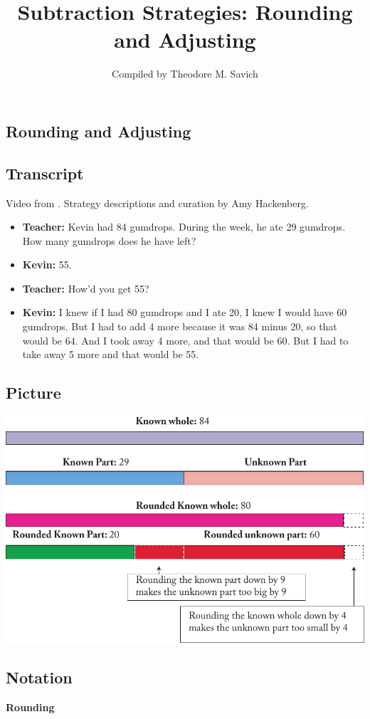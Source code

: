 \documentclass[11pt]{article}
\title{Subtraction Strategies: Rounding and Adjusting}
\author{Compiled by Theodore M. Savich}
\begin{document}
\maketitle
\subsection*{Rounding and Adjusting}


\subsection*{Transcript}
Video from \textcite{Carpenter1999}. Strategy descriptions and curation by Amy Hackenberg. 

\begin{itemize}
\item \textbf{Teacher:} Kevin had 84 gumdrops. During the week, he ate 29 gumdrops. How many gumdrops does he have left?
\item \textbf{Kevin:} 55. 
\item \textbf{Teacher:} How'd you get 55? 
\item \textbf{Kevin:} I knew if I had 80 gumdrops and I ate 20, I knew I would have 60 gumdrops. But I had to add 4 more because it was 84 minus 20, so that would be 64. And I took away 4 more, and that would be 60. But I had to take away 5 more and that would be 55. 
\end{itemize}

\subsection*{Picture}
\begin{center}
    \includegraphics[width=.8\textwidth]{./images/Easy_Pictures/SAR_SUB_ROUNDING_PICTURES/PDF/SAR_SUB_Rounding.pdf}
\end{center}
\subsection*{Notation}
\textbf{Rounding}
\end{document}
